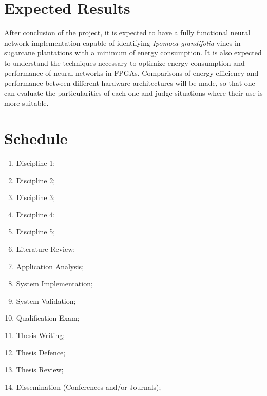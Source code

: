 \documentclass[
	12pt,				%
	oneside,			%
	a4paper,			%
	brazil,			    %
	french,				%
	spanish,			%
	english,			%
	]{abntex2}
\begin{document}
\section{Expected Results}


  After conclusion of the project, it is expected to have a fully functional neural network implementation capable of identifying \textit{Ipomoea grandifolia} vines in sugarcane plantations with a minimum of energy consumption. It is also expected to understand the techniques necessary to optimize energy consumption and performance of neural networks in FPGAs. Comparisons of energy efficiency and performance between different hardware architectures will be made, so that one can evaluate the particularities of each one and judge situations where their use is more suitable.
        
\section{Schedule} \label{sec:scheadule}
\begin{enumerate}
	\item Discipline 1; %
	\item Discipline 2; %
	\item Discipline 3; %
	\item Discipline 4; %
	\item Discipline 5; %
	\item Literature Review; %
	\item Application Analysis; %
	\item System Implementation; %
	\item System Validation; %
	\item Qualification Exam; %
	\item Thesis Writing; %
	\item Thesis Defence; %
	\item Thesis Review; %
	\item Dissemination (Conferences and/or Journals); %
\end{enumerate}
\end{document}
